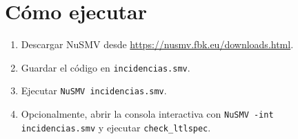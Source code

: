 \documentclass[11pt,a4paper]{article}
\begin{document}
\section{Cómo ejecutar}

\begin{enumerate}
  \item Descargar NuSMV desde \url{https://nusmv.fbk.eu/downloads.html}.
  \item Guardar el código en \texttt{incidencias.smv}.
  \item Ejecutar \texttt{NuSMV incidencias.smv}.
  \item Opcionalmente, abrir la consola interactiva con \texttt{NuSMV -int incidencias.smv} y ejecutar \texttt{check\_ltlspec}.
\end{enumerate}
\end{document}
